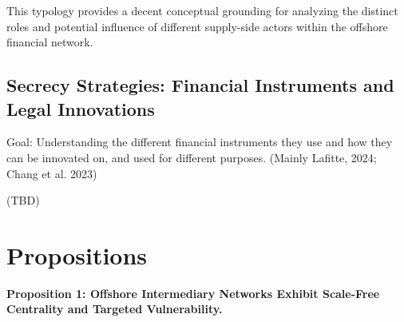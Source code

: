 This typology provides a decent conceptual grounding for analyzing the distinct roles and potential influence of different supply-side actors within the offshore financial network.

\subsection{Secrecy Strategies: Financial Instruments and Legal Innovations}
\label{subsec:2_1_5}

Goal: Understanding the different financial instruments they use and how they can be innovated on, and used for different purposes. (Mainly Lafitte, 2024; Chang et al. 2023)

(TBD)


\section{Propositions}
\label{sec:2_2}

\textbf{Proposition 1: Offshore Intermediary Networks Exhibit Scale-Free Centrality and Targeted Vulnerability.}

